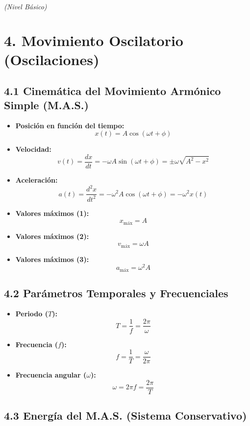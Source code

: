 \documentclass[11pt,a4paper]{article}
\begin{document}
\textit{(Nivel Básico)}

\section*{4. Movimiento Oscilatorio (Oscilaciones)}

\subsection*{4.1 Cinemática del Movimiento Armónico Simple (M.A.S.)}

\begin{itemize}
  \item \textbf{Posición en función del tiempo:}
  \[
    x(t) = A \cos(\omega t + \phi)
  \]
  \item \textbf{Velocidad:}
  \[
    v(t) = \frac{dx}{dt} = -\omega A \sin(\omega t + \phi) = \pm \omega \sqrt{A^2 - x^2}
  \]
  \item \textbf{Aceleración:}
  \[
    a(t) = \frac{d^2x}{dt^2} = -\omega^2 A \cos(\omega t + \phi) = -\omega^2 x(t)
  \]
  \item \textbf{Valores máximos (1):}
  \[
    x_{\mathrm{máx}} = A
  \]
  \item \textbf{Valores máximos (2):}
  \[
    v_{\mathrm{máx}} = \omega A
  \]
  \item \textbf{Valores máximos (3):}
  \[
    a_{\mathrm{máx}} = \omega^2 A
  \]
\end{itemize}

\subsection*{4.2 Parámetros Temporales y Frecuenciales}

\begin{itemize}
  \item \textbf{Periodo ($T$):}
  \[
    T = \frac{1}{f} = \frac{2\pi}{\omega}
  \]
  \item \textbf{Frecuencia ($f$):}
  \[
    f = \frac{1}{T} = \frac{\omega}{2\pi}
  \]
  \item \textbf{Frecuencia angular ($\omega$):}
  \[
    \omega = 2\pi f = \frac{2\pi}{T}
  \]
\end{itemize}

\subsection*{4.3 Energía del M.A.S. (Sistema Conservativo)}
\end{document}
